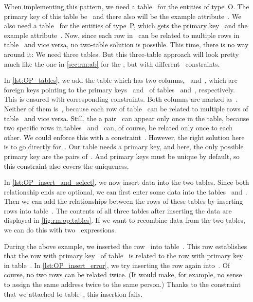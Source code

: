When implementing this pattern, we need a table~ for the entities of type~O.
The primary key of this table be~ and there also will be the example attribute~.
We also need a table~ for the entities of type~P, which gets the primary key~ and the example attribute~.
Now, since each row in~ can be related to multiple rows in table~ and vice versa, no two-table solution is possible.
This time, there is no way around it:
We need three tables.
But this three-table approach will look pretty much like the one in \cref{sec:rm:ab} for the , but with different~ constraints.

In \cref{lst:OP_tables}, we add the table  which has two columns,~ and~, which are foreign keys pointing to the primary keys~ and~ of tables~ and~, respectively.
This is ensured with corresponding  constraints.
Both columns are marked as~.
Neither of them is~, because each row of table~ can be related to multiple rows of table~ and vice versa.
Still, the a pair~ can appear only once in the table, because two specific rows in tables~ and~ can, of course, be related only once to each other.
We could enforce this with a constraint~.
However, the right solution here is to go directly for~.
Our table needs a primary key, and here, the only possible primary key are the pairs of~.
And primary keys must be unique by default, so this constraint also covers the uniqueness.

In \cref{lst:OP_insert_and_select}, we now insert data into the two tables.
Since both relationship ends are optional, we can first enter some data into the tables~ and~.
Then we can add the relationships between the rows of these tables by inserting rows into table~.
The contents of all three tables after inserting the data are displayed in \cref{fig:rm:op:tables}.
If we want to recombine data from the two tables, we can do this with two ~expressions.

During the above example, we inserted the row~ into table~.
This row establishes that the row with primary key~ of table~ is related to the row with primary key~ in table~.
In \cref{lst:OP_insert_error}, we try inserting the row again into~.
Of course, no two rows can be related twice.
(It would make, for example, no sense to assign the same address twice to the same person.)
Thanks to the  constraint that we attached to table~, this insertion fails.%
%
\FloatBarrier%
\endhsection%
%
